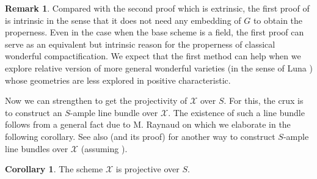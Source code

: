 \documentclass[11pt, reqno]{amsart}
\theoremstyle{plain}
\theoremstyle{definition}
\newtheorem{corollary}[theorem]{Corollary}
\newtheorem{remark}[theorem]{Remark}
\begin{document}
\begin{remark}\label{remarkproperness}
    Compared with the second proof which is extrinsic, the first proof of  is intrinsic in the sense that it does not need any embedding of $G$ to obtain the properness. Even in the case when the base scheme is a field, the first proof can serve as an equivalent but intrinsic reason for the properness of classical wonderful compactification. We expect that the first method can help when we explore relative version of more general wonderful varieties (in the sense of Luna \cite{Lunawonderfulvarieties}) whose geometries are less explored in positive characteristic.
\end{remark}

Now we can strengthen  to get the projectivity of $\mathcal{X}$ over $S$. For this, the crux is to construct an $S$-ample line bundle over $\mathcal{X}$. The existence of such a line bundle follows from a general fact due to M. Raynaud on which we elaborate in the following corollary. See also  (and its proof) for another way to construct $S$-ample line bundles over $\mathcal{X}$ (assuming ).

\begin{corollary}\label{projectivity}
    The scheme $\mathcal{X}$ is projective over $S$.
\end{corollary}
\end{document}
